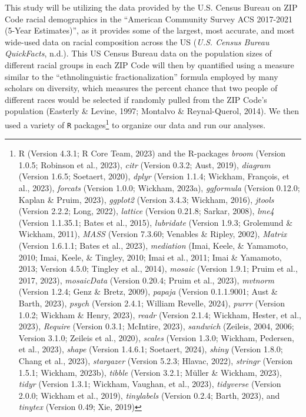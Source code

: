 \documentclass[
  man,floatsintext]{apa7}
\begin{document}
This study will be utilizing the data provided by the U.S. Census Bureau on ZIP Code racial demographics in the ``American Community Survey ACS 2017-2021 (5-Year Estimates)'', as it provides some of the largest, most accurate, and most wide-used data on racial composition across the US (\emph{U.{S}. {Census Bureau QuickFacts}}, n.d.). This US Census Bureau data on the population sizes of different racial groups in each ZIP Code will then by quantified using a measure similar to the ``ethnolinguistic fractionalization'' formula employed by many scholars on diversity, which measures the percent chance that two people of different races would be selected if randomly pulled from the ZIP Code's population (Easterly \& Levine, 1997; Montalvo \& Reynal-Querol, 2014). We then used a variety of \texttt{R} packages\footnote{R (Version 4.3.1; R Core Team, 2023) and the R-packages \emph{broom} (Version 1.0.5; Robinson et al., 2023), \emph{citr} (Version 0.3.2; Aust, 2019), \emph{diagram} (Version 1.6.5; Soetaert, 2020), \emph{dplyr} (Version 1.1.4; Wickham, François, et al., 2023), \emph{forcats} (Version 1.0.0; Wickham, 2023a), \emph{ggformula} (Version 0.12.0; Kaplan \& Pruim, 2023), \emph{ggplot2} (Version 3.4.3; Wickham, 2016), \emph{jtools} (Version 2.2.2; Long, 2022), \emph{lattice} (Version 0.21.8; Sarkar, 2008), \emph{lme4} (Version 1.1.35.1; Bates et al., 2015), \emph{lubridate} (Version 1.9.3; Grolemund \& Wickham, 2011), \emph{MASS} (Version 7.3.60; Venables \& Ripley, 2002), \emph{Matrix} (Version 1.6.1.1; Bates et al., 2023), \emph{mediation} (Imai, Keele, \& Yamamoto, 2010; Imai, Keele, \& Tingley, 2010; Imai et al., 2011; Imai \& Yamamoto, 2013; Version 4.5.0; Tingley et al., 2014), \emph{mosaic} (Version 1.9.1; Pruim et al., 2017, 2023), \emph{mosaicData} (Version 0.20.4; Pruim et al., 2023), \emph{mvtnorm} (Version 1.2.4; Genz \& Bretz, 2009), \emph{papaja} (Version 0.1.1.9001; Aust \& Barth, 2023), \emph{psych} (Version 2.4.1; William Revelle, 2024), \emph{purrr} (Version 1.0.2; Wickham \& Henry, 2023), \emph{readr} (Version 2.1.4; Wickham, Hester, et al., 2023), \emph{Require} (Version 0.3.1; McIntire, 2023), \emph{sandwich} (Zeileis, 2004, 2006; Version 3.1.0; Zeileis et al., 2020), \emph{scales} (Version 1.3.0; Wickham, Pedersen, et al., 2023), \emph{shape} (Version 1.4.6.1; Soetaert, 2024), \emph{shiny} (Version 1.8.0; Chang et al., 2023), \emph{stargazer} (Version 5.2.3; Hlavac, 2022), \emph{stringr} (Version 1.5.1; Wickham, 2023b), \emph{tibble} (Version 3.2.1; Müller \& Wickham, 2023), \emph{tidyr} (Version 1.3.1; Wickham, Vaughan, et al., 2023), \emph{tidyverse} (Version 2.0.0; Wickham et al., 2019), \emph{tinylabels} (Version 0.2.4; Barth, 2023), and \emph{tinytex} (Version 0.49; Xie, 2019)} to organize our data and run our analyses.
\end{document}
